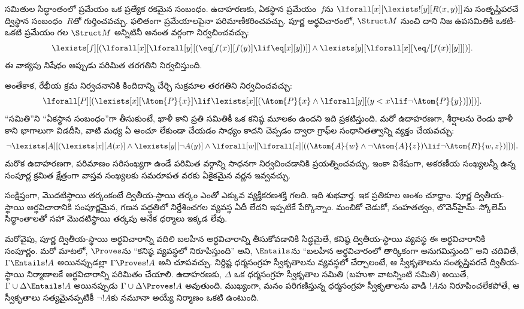 \documentclass[../../../include/open-logic-section]{subfiles}
\begin{document}
సమితుల సిద్ధాంతంలో ప్రమేయం ఒక ప్రత్యేక రకమైన సంబంధం.
ఉదాహరణకు, ఏకస్థాన ప్రమేయం~$f$ను
$\lforall[x][\lexists![y][R(x,y)]]$ను సంతృప్తిపరచే ద్విస్థాన
సంబంధం~$R$తో గుర్తించవచ్చు. ఫలితంగా ప్రమేయాలపైనా పరిమాణీకరించవచ్చు.
పూర్ణ అర్థవిచారంలో, $\Struct M$  నుంచి దాని నిజ
ఉపసమితికి ఒకటి-ఒకటి ప్రమేయం గల  $\Struct M$ అన్నిటినీ
అనంత  వర్గంగా నిర్వచించవచ్చు:
\[
\lexists[f][(\lforall[x][\lforall[y][(\eq[f(x)][f(y)] \lif \eq[x][y])]]
  \land \lexists[y][\lforall[x][\eq/[f(x)][y]]])].
\]
ఈ వాక్యపు నిషేధం అప్పుడు పరిమిత  తరగతిని నిర్వచిస్తుంది.

అంతేకాక, రేఖీయ క్రమ నిర్వచనానికి కిందిదాన్ని చేర్చి సుక్రమాల
తరగతిని నిర్వచించవచ్చు:
\[
\lforall[P][(\lexists[x][\Atom{P}{x}] \lif \lexists[x][(\Atom{P}{x}
    \land \lforall[y][(y < x \lif \lnot \Atom{P}{y})])])].
\]
``సమితి''ని ``ఏకస్థాన సంబంధం''గా తీసుకుంటే, ఖాళీ
కాని ప్రతి సమితికీ ఒక కనిష్ఠ మూలకం ఉందని ఇది ప్రకటిస్తుంది. మరో
ఉదాహరణగా, శీర్షాలను రెండు ఖాళీ కాని భాగాలుగా విడదీసి, వాటి మధ్య ఏ అంచూ లేకుండా
చేయడం సాధ్యం కాదని చెప్పడం ద్వారా గ్రాఫ్‌ల సంధానితత్వాన్ని
వ్యక్తం చేయవచ్చు:
\[
\lnot \lexists[A][(\lexists[x][A(x)] \land \lexists[y][\lnot A(y)]
  \land \lforall[w][\lforall[z][((\Atom{A}{w} \land \lnot \Atom{A}{z})
      \lif \lnot \Atom{R}{w,z})]])].
\]
మరొక ఉదాహరణగా,  పరిమాణం సరిసంఖ్యగా ఉండే పరిమిత
 వర్గాన్ని సాధనగా నిర్వచించడానికి ప్రయత్నించవచ్చు.
ఇంకా విశేషంగా, అకరణీయ సంఖ్యలన్నీ ఉన్న సంపూర్ణ క్రమిత క్షేత్రంగా
వాస్తవ సంఖ్యలకు సమరూపత వరకు ఏకైకమైన వర్ణన ఇవ్వవచ్చు.

సంక్షిప్తంగా, మొదటిస్థాయి తర్కంకంటే ద్వితీయ-స్థాయి తర్కం ఎంతో ఎక్కువ
వ్యక్తీకరణశక్తి గలది. ఇది శుభవార్త. ఇక ప్రతికూల అంశం చూద్దాం. పూర్ణ
ద్వితీయ-స్థాయి అర్థవిచారానికి సంపూర్ణమైన, గణన పద్ధతిలో నిర్దేశించగల
 వ్యవస్థ ఏదీ లేదని ఇప్పటికే పేర్కొన్నాం. మంచికో చెడుకో,
సంహతత్వం, లొవెన్‌హైమ్--స్కోలెమ్ సిద్ధాంతాలతో సహా మొదటిస్థాయి
తర్కపు అనేక ధర్మాలు ఇక్కడ లేవు.

మరోవైపు, పూర్ణ ద్వితీయ-స్థాయి అర్థవిచారాన్ని వదిలి బలహీన
అర్థవిచారాన్ని తీసుకోవడానికి సిద్ధమైతే, కనిష్ఠ ద్వితీయ-స్థాయి
 వ్యవస్థ ఈ అర్థవిచారానికి సంపూర్ణం. మరో మాటలో,
$\Proves$ను ``కనిష్ఠ వ్యవస్థలో నిరూపిస్తుంది'' అని, $\Entails$ను
``బలహీన అర్థవిచారంలో తార్కికంగా అనుగమిస్తుంది'' అని చదివితే,
$\Gamma \Entails !A$ అయినప్పుడల్లా $\Gamma \Proves !A$ అని
చూపవచ్చు. నిర్దిష్ట ధర్మసంగ్రహ స్వీకృతాలను  వ్యవస్థలో
చేర్చాలంటే, ఆ స్వీకృతాలను సంతృప్తిపరచే ద్వితీయ-స్థాయి నిర్మాణాలకే
అర్థవిచారాన్ని పరిమితం చేయాలి. ఉదాహరణకు, $\Delta$ ఒక ధర్మసంగ్రహ
స్వీకృతాల సమితి (బహుశా వాటన్నింటి సమితి) అయితే,
$\Gamma \cup \Delta \Entails !A$ అయినప్పుడు
$\Gamma \cup \Delta \Proves !A$ అవుతుంది. ముఖ్యంగా, మనం పరిగణిస్తున్న
ధర్మసంగ్రహ స్వీకృతాలను వాడి $!A$ను నిరూపించలేకపోతే, ఆ స్వీకృతాలు
సత్యమైనప్పటికీ $\lnot !A$కు నమూనా అయ్యే నిర్మాణం ఒకటి ఉంటుంది.
\end{document}

